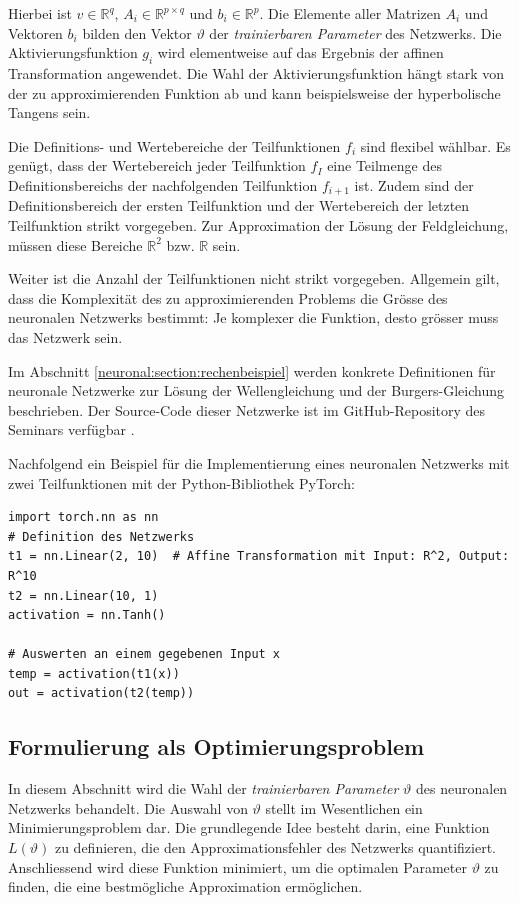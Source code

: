 Hierbei ist \( v \in \mathbb{R}^q \), \( A_i \in \mathbb{R}^{p \times q} \) und \( b_i \in \mathbb{R}^p \). 
Die Elemente aller Matrizen \( A_i \) und Vektoren \( b_i \) bilden den Vektor \( \vartheta \) der \emph{trainierbaren Parameter} des Netzwerks.
Die Aktivierungsfunktion \( g_i \) wird elementweise auf das Ergebnis der affinen Transformation angewendet.
Die Wahl der Aktivierungsfunktion hängt stark von der zu approximierenden Funktion ab und kann beispielsweise der hyperbolische Tangens sein.

Die Definitions- und Wertebereiche der Teilfunktionen \( f_i \) sind flexibel wählbar. 
Es genügt, dass der Wertebereich jeder Teilfunktion \( f_I \) eine Teilmenge des Definitionsbereichs der nachfolgenden Teilfunktion \( f_{i+1} \) ist.
Zudem sind der Definitionsbereich der ersten Teilfunktion und der Wertebereich der letzten Teilfunktion strikt vorgegeben. 
Zur Approximation der Lösung der Feldgleichung, müssen diese Bereiche \( \mathbb{R}^2 \) bzw. \( \mathbb{R} \) sein.

Weiter ist die Anzahl der Teilfunktionen nicht strikt vorgegeben. 
Allgemein gilt, dass die Komplexität des zu approximierenden Problems die Grösse des neuronalen Netzwerks bestimmt: Je komplexer die Funktion, desto grösser muss das Netzwerk sein.

Im Abschnitt \ref{neuronal:section:rechenbeispiel} werden konkrete Definitionen für neuronale Netzwerke zur Lösung der Wellengleichung und der Burgers-Gleichung beschrieben.
Der Source-Code dieser Netzwerke ist im GitHub-Repository des Seminars verfügbar \cite{neuronal:github_source_code}.

Nachfolgend ein Beispiel für die Implementierung eines neuronalen Netzwerks mit zwei Teilfunktionen mit der Python-Bibliothek PyTorch:

\begin{lstlisting}
import torch.nn as nn
# Definition des Netzwerks
t1 = nn.Linear(2, 10)  # Affine Transformation mit Input: R^2, Output: R^10
t2 = nn.Linear(10, 1)
activation = nn.Tanh()

# Auswerten an einem gegebenen Input x
temp = activation(t1(x))
out = activation(t2(temp))
\end{lstlisting}

\subsection{Formulierung als Optimierungsproblem}\label{neuronal:subsection:optimierungsproblem}
In diesem Abschnitt wird die Wahl der \emph{trainierbaren Parameter} $\vartheta$ des neuronalen Netzwerks behandelt.
Die Auswahl von $\vartheta$ stellt im Wesentlichen ein Minimierungsproblem dar.
Die grundlegende Idee besteht darin, eine Funktion \( L(\vartheta) \) zu definieren, die den Approximationsfehler des Netzwerks quantifiziert.
Anschliessend wird diese Funktion minimiert, um die optimalen Parameter $\vartheta$ zu finden, die eine bestmögliche Approximation ermöglichen.

